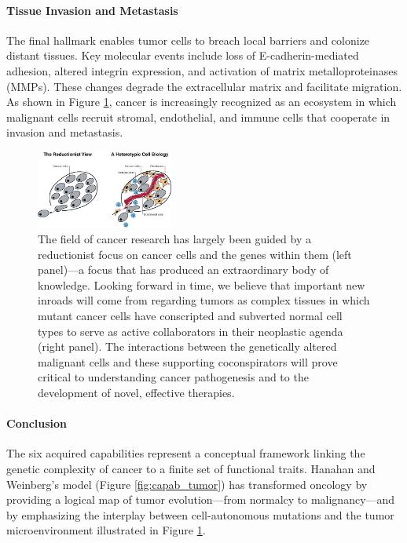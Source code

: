 \documentclass[10pt]{extarticle}
\begin{document}
\paragraph{Tissue Invasion and Metastasis}
The final hallmark enables tumor cells to breach local barriers and colonize distant tissues. Key molecular events include loss of E-cadherin-mediated adhesion, altered integrin expression, and activation of matrix metalloproteinases (MMPs). These changes degrade the extracellular matrix and facilitate migration. As shown in Figure \ref{fig:complex_tumor}, cancer is increasingly recognized as an ecosystem in which malignant cells recruit stromal, endothelial, and immune cells that cooperate in invasion and metastasis.

\begin{figure}[h]
    \centering
    \includegraphics[width=0.4\textwidth]{Figures/Tumors as Complex Tissues.jpg} %
    \caption{The field of cancer research has largely been
guided by a reductionist focus on cancer cells
and the genes within them (left panel)—a focus
that has produced an extraordinary body
of knowledge. Looking forward in time, we
believe that important new inroads will come
from regarding tumors as complex tissues in
which mutant cancer cells have conscripted
and subverted normal cell types to serve as
active collaborators in their neoplastic agenda
(right panel). The interactions between the
genetically altered malignant cells and these
supporting coconspirators will prove critical
to understanding cancer pathogenesis and to
the development of novel, effective therapies.}
    \label{fig:complex_tumor}
\end{figure}

\paragraph{Conclusion}
The six acquired capabilities represent a conceptual framework linking the genetic complexity of cancer to a finite set of functional traits. Hanahan and Weinberg’s model (Figure \ref{fig:capab_tumor}) has transformed oncology by providing a logical map of tumor evolution—from normalcy to malignancy—and by emphasizing the interplay between cell-autonomous mutations and the tumor microenvironment illustrated in Figure \ref{fig:complex_tumor}.
\end{document}
